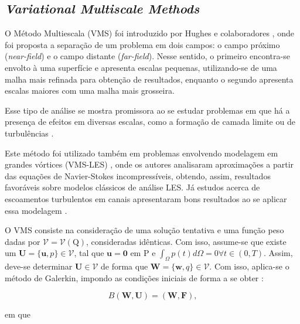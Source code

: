 \documentclass[_ArquivoPrincipal.tex]{subfiles}
\begin{document}
\subsection{\textit{Variational Multiscale Methods}} \label{VMS}

O Método Multiescala (VMS) foi introduzido por Hughes e colaboradores \cite{hughes1995multiscale, hughes1996space, hughes1998variational}, onde foi proposta a separação de um problema em dois campos: o campo próximo (\textit{near-field}) e o campo distante (\textit{far-field}). Nesse sentido, o primeiro encontra-se envolto à uma superfície e apresenta escalas pequenas, utilizando-se de uma malha mais refinada para obtenção de resultados, enquanto o segundo apresenta escalas maiores com uma malha mais grosseira.

Esse tipo de análise se mostra promissora ao se estudar problemas em que há a presença de efeitos em diversas escalas, como a formação de camada limite ou de turbulências \cite{fernandes2020tecnica}.

Este método foi utilizado também em problemas envolvendo modelagem em grandes vórtices (VMS-LES) \cite{hughes2000large, bazilevs2007variational}, onde os autores analisaram aproximações a partir das equações de Navier-Stokes incompressíveis, obtendo, assim, resultados favoráveis sobre modelos clássicos de análise LES. Já estudos acerca de escoamentos turbulentos em canais apresentaram bons resultados ao se aplicar essa modelagem \cite{hughes2002variational}.

O VMS consiste na consideração de uma solução tentativa e uma função peso dadas por $\mathcal{V}=\mathcal{V}(\mathrm{Q})$, consideradas idênticas. Com isso, assume-se que existe um $\mathbf{U}=\{\mathbf{u},p\}\in\mathcal{V}$, tal que $\mathbf{u}=\mathbf{0}$ em $\mathrm{P}$ e $\int_{\Omega}{p(t)d\Omega}=0\forall t\in(0,T)$. Assim, deve-se determinar $\mathbf{U}\in\mathcal{V}$ de forma que $\mathbf{W}=\{\mathbf{w},q\}\in\mathcal{V}$. Com isso, aplica-se o método de Galerkin, impondo as condições iniciais de forma a se obter \cite{hughes2002variational}:

\begin{equation}
    B(\mathbf{W},\mathbf{U})=(\mathbf{W},\mathbf{F})\text{,}
    \label{B}
\end{equation}

\noindent em que
\end{document}

